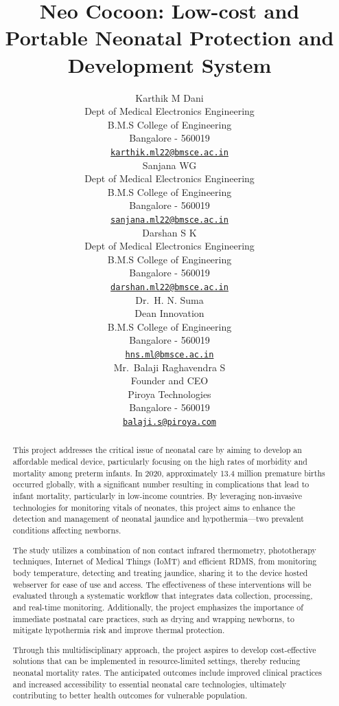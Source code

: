 \documentclass{article}
\title{Neo Cocoon: Low-cost and Portable Neonatal Protection and
Development System}
\author{
    Karthik M Dani
   \\
    Dept of Medical Electronics Engineering \\
    B.M.S College of Engineering \\
  Bangalore - 560019 \\
  \texttt{\href{mailto:karthik.ml22@bmsce.ac.in}{\nolinkurl{karthik.ml22@bmsce.ac.in}}} \\
   \And
    Sanjana WG
   \\
    Dept of Medical Electronics Engineering \\
    B.M.S College of Engineering \\
  Bangalore - 560019 \\
  \texttt{\href{mailto:sanjana.ml22@bmsce.ac.in}{\nolinkurl{sanjana.ml22@bmsce.ac.in}}} \\
   \And
    Darshan S K
   \\
    Dept of Medical Electronics Engineering \\
    B.M.S College of Engineering \\
  Bangalore - 560019 \\
  \texttt{\href{mailto:darshan.ml22@bmsce.ac.in}{\nolinkurl{darshan.ml22@bmsce.ac.in}}} \\
   \And
    Dr.~H. N. Suma
   \\
    Dean Innovation \\
    B.M.S College of Engineering \\
  Bangalore - 560019 \\
  \texttt{\href{mailto:hns.ml@bmsce.ac.in}{\nolinkurl{hns.ml@bmsce.ac.in}}} \\
   \And
    Mr.~Balaji Raghavendra S
   \\
    Founder and CEO \\
    Piroya Technologies \\
  Bangalore - 560019 \\
  \texttt{\href{mailto:balaji.s@piroya.com}{\nolinkurl{balaji.s@piroya.com}}} \\
  }
\begin{document}
\maketitle


\begin{abstract}
This project addresses the critical issue of neonatal care by aiming to
develop an affordable medical device, particularly focusing on the high
rates of morbidity and mortality among preterm infants. In 2020,
approximately 13.4 million premature births occurred globally, with a
significant number resulting in complications that lead to infant
mortality, particularly in low-income countries. By leveraging
non-invasive technologies for monitoring vitals of neonates, this
project aims to enhance the detection and management of neonatal
jaundice and hypothermia---two prevalent conditions affecting newborns.

The study utilizes a combination of non contact infrared thermometry,
phototherapy techniques, Internet of Medical Things (IoMT) and efficient
RDMS, from monitoring body temperature, detecting and treating jaundice,
sharing it to the device hosted webserver for ease of use and access.
The effectiveness of these interventions will be evaluated through a
systematic workflow that integrates data collection, processing, and
real-time monitoring. Additionally, the project emphasizes the
importance of immediate postnatal care practices, such as drying and
wrapping newborns, to mitigate hypothermia risk and improve thermal
protection.

Through this multidisciplinary approach, the project aspires to develop
cost-effective solutions that can be implemented in resource-limited
settings, thereby reducing neonatal mortality rates. The anticipated
outcomes include improved clinical practices and increased accessibility
to essential neonatal care technologies, ultimately contributing to
better health outcomes for vulnerable population.
\end{abstract}

\end{document}
